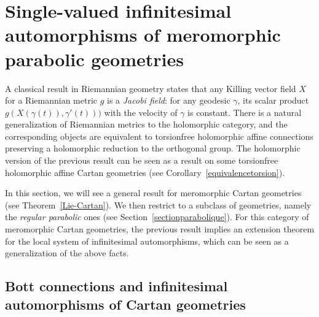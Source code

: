 \documentclass[10pt,a4paper]{amsart}
\numberwithin{equation}{section}
\begin{document}
\section{Single-valued infinitesimal automorphisms of meromorphic \allowbreak parabolic geometries}\label{killparab}
A classical result in Riemannian geometry states that any Killing vector field $X$ for a Riemannian metric $g$ is a \textit{Jacobi field}: for any geodesic $\gamma$, its scalar product $g(X(\gamma(t)),\gamma'(t)))$ with the velocity of $\gamma$ is constant. There is a natural generalization of Riemannian metrics to the holomorphic category, and the corresponding objects are equivalent to torsionfree holomorphic affine connections preserving a holomorphic reduction to the orthogonal group. The holomorphic version of the previous result can be seen as a result on some torsionfree holomorphic affine Cartan geometries (see Corollary~\ref{equivalencetorsion}).

In this section, we will see a general result for meromorphic Cartan geometries (see Theorem~\ref{Lie-Cartan}). We then restrict to a subclass of geometries, namely the \textit{regular parabolic} ones (see Section~\ref{sectionparabolique}). For this category of meromorphic Cartan geometries, the previous result implies an extension theorem for the local system of infinitesimal automorphisms, which can be seen as a generalization of the above facts.


\subsection{Bott connections and infinitesimal automorphisms of Cartan geometries}\label{sectionBott}
\end{document}
